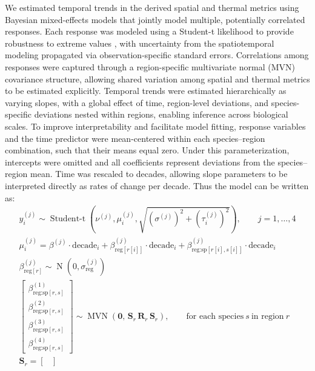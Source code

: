 \documentclass[9pt,twocolumn,twoside]{pnas-new}
\begin{document}
{We estimated temporal trends in the derived spatial and thermal metrics using Bayesian mixed-effects models that jointly model multiple, potentially correlated responses. Each response was modeled using a Student-t likelihood to provide robustness to extreme values \citep[e.g.,][]{anderson_black-swan_2017}, with uncertainty from the spatiotemporal modeling propagated via observation-specific standard errors. Correlations among responses were captured through a region-specific multivariate normal (MVN) covariance structure, allowing shared variation among spatial and thermal metrics to be estimated explicitly. Temporal trends were estimated hierarchically as varying slopes, with a global effect of time, region-level deviations, and species-specific deviations nested within regions, enabling inference across biological scales. To improve interpretability and facilitate model fitting, response variables and the time predictor were mean-centered within each species–region combination, such that their means equal zero. Under this parameterization, intercepts were omitted and all coefficients represent deviations from the species–region mean. Time was rescaled to decades, allowing slope parameters to be interpreted directly as rates of change per decade.
Thus the model can be written as:
\begin{gather}
y_{i}^{(j)} \sim \operatorname{Student\text{-}t}
\left(\nu^{(j)}, 
\mu_{i}^{(j)}, 
\sqrt{(\sigma^{(j)})^{2} + (\tau^{(j)}_{i})^{2}}
\right),
\qquad j=1,\dots,4 \label{eq:likelihood}
\\
\mu_{i}^{(j)} =
\beta^{(j)} \cdot \text{decade}_{i}
+ \beta_{\text{reg}[r[i]]}^{(j)} \cdot \text{decade}_{i}
+ \beta_{\text{reg:sp}[r[i],s[i]]}^{(j)} \cdot \text{decade}_{i} \label{eq:linearpred}
\\
\beta_{\text{reg}[r]}^{(j)} \sim 
\operatorname{N}\!\left(0,\sigma_{\text{reg}}^{(j)}\right) \label{eq:regionslope}
\\
\begin{bmatrix}
\beta_{\text{reg:sp}[r,s]}^{(1)} \\
\beta_{\text{reg:sp}[r,s]}^{(2)} \\
\beta_{\text{reg:sp}[r,s]}^{(3)} \\
\beta_{\text{reg:sp}[r,s]}^{(4)}
\end{bmatrix}
\sim 
\operatorname{MVN}\!\left(
\mathbf{0},\,
\mathbf{S}_{r}\,\mathbf{R}_{r}\,\mathbf{S}_{r}
\right),
\qquad \text{for each species}~s~\text{in region}~r \label{eq:mvn}
\\
\mathbf{S}_{r} =
\begin{bmatrix}

\end{bmatrix}
\end{gather}}
\end{document}
